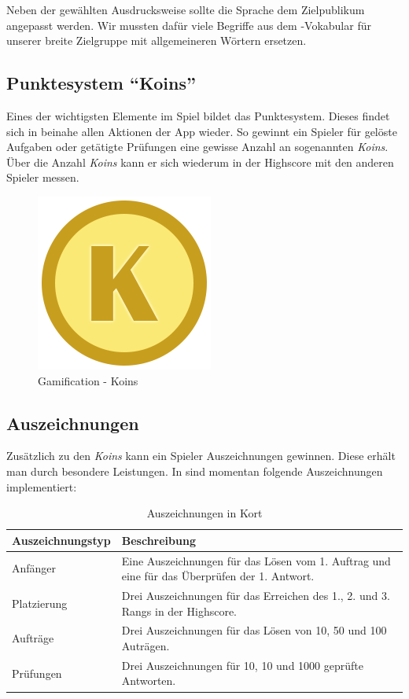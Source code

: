 Neben der gewählten Ausdrucksweise sollte die Sprache dem Zielpublikum angepasst werden.
Wir mussten dafür viele Begriffe aus dem -Vokabular für unserer breite Zielgruppe mit allgemeineren Wörtern ersetzen.

\subsection{Punktesystem "`Koins"'}
Eines der wichtigsten Elemente im Spiel bildet das Punktesystem. Dieses findet sich in beinahe allen Aktionen der App wieder.
So gewinnt ein Spieler für gelöste Aufgaben oder getätigte Prüfungen eine gewisse Anzahl an sogenannten \emph{Koins}.
Über die Anzahl \emph{Koins} kann er sich wiederum in der Highscore mit den anderen Spieler messen.

\begin{figure}[H]
	\centering
	\includegraphics[scale=0.4]{images/gamification/gamification-koin}
	\caption{Gamification - Koins}
	\label{gamification-koins}
\end{figure}

\subsection{Auszeichnungen}
Zusätzlich zu den \emph{Koins} kann ein Spieler Auszeichnungen gewinnen. Diese erhält man durch besondere Leistungen. In \kort sind momentan folgende Auszeichnungen implementiert:

\begin{table}[H]
\centering
\begin{tabular}{|p{0.25\twocelltabwidth}|p{0.75\twocelltabwidth}|}
\hline 
\textbf{Auszeichnungstyp} & \textbf{Beschreibung} \\ 
\hline 
Anfänger & Eine Auszeichnungen für das Lösen vom 1. Auftrag und eine für das Überprüfen der 1. Antwort. \\ 
\hline 
Platzierung & Drei Auszeichnungen für das Erreichen des 1., 2. und 3. Rangs in der Highscore. \\ 
\hline 
Aufträge & Drei Auszeichnungen für das Lösen von 10, 50 und 100 Auträgen. \\ 
\hline 
Prüfungen & Drei Auszeichnungen für 10, 10 und 1000 geprüfte Antworten. \\ 
\hline 
\end{tabular} 
\caption{Auszeichnungen in Kort}
\label{kort-badges}
\end{table}

